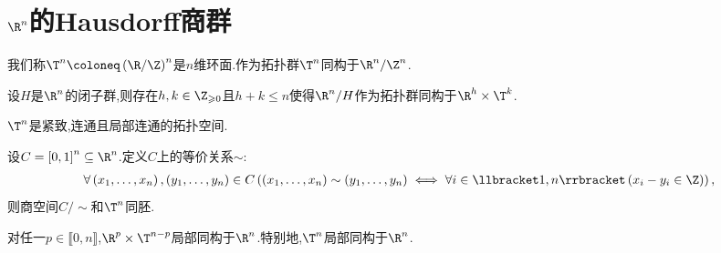 \section{\texorpdfstring{$\R^{n}$}{Rn}的Hausdorff商群}

\begin{definition}{}{}
	我们称$\T^{n}\coloneq\left(\R/\Z\right)^{n}$是$n$维环面.作为拓扑群$\T^{n}$同构于$\R^{n}/\Z^{n}$.
\end{definition}

\begin{theorem}{}{}
	设$H$是$\R^{n}$的闭子群,则存在$h,k\in\Z_{\geqslant 0}$且$h+k\leqslant n$使得$\R^{n}/H$作为拓扑群同构于$\R^{h}\times\T^{k}$.
\end{theorem}

\begin{proposition}{}{}
	$\T^{n}$是紧致,连通且局部连通的拓扑空间.
\end{proposition}

\begin{proposition}{}{}
	设$C=\left[0,1\right]^{n}\subseteq\R^{n}$.定义$C$上的等价关系$\sim$:
	\begin{align*}
		\forall\left(x_{1},\ldots,x_{n}\right),\left(y_{1},\ldots,y_{n}\right)\in C\left(\left(x_{1},\ldots,x_{n}\right)\sim\left(y_{1},\ldots,y_{n}\right)\iff\forall i\in\llbracket 1,n\rrbracket\left(x_{i}-y_{i}\in\Z\right)\right),
	\end{align*}
	则商空间$C/\sim$和$\T^{n}$同胚.
\end{proposition}

\begin{proposition}{}{}
	对任一$p\in\llbracket 0,n\rrbracket$,$\R^{p}\times\T^{n-p}$局部同构于$\R^{n}$.特别地,$\T^{n}$局部同构于$\R^{n}$.
\end{proposition}